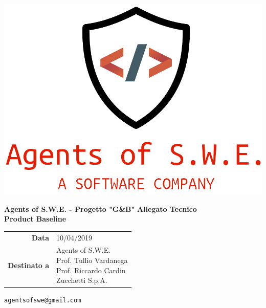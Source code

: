 


\begin{titlepage}
\thispagestyle{empty}

\begin{center}

\includegraphics[scale=0.3]{./images/logo.png} 

\large \textbf{Agents of S.W.E. - Progetto "G\&B"}
\vfill
\Huge \textbf{Allegato Tecnico}\\ \textbf{Product Baseline}
\vfill
\large
\renewcommand{\arraystretch}{1.3}
\begin{tabular}{r|l}
\textbf{Data} & 10/04/2019\\
\textbf{Destinato a} & \parbox[t]{5cm}{Agents of S.W.E. \\Prof. Tullio Vardanega\\Prof. Riccardo Cardin \\ Zucchetti S.p.A.}
\end{tabular}
\vfill
\small
\texttt{agentsofswe@gmail.com}
\end{center}
\end{titlepage}

\pagebreak

